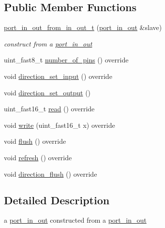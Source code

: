\subsection*{Public Member Functions}
\begin{DoxyCompactItemize}
\item 
\mbox{\label{classhwlib_1_1port__in__out__from__in__out__t_a44a7dec3d4fd5604177a07c6c7fa9838}} 
\hyperlink{classhwlib_1_1port__in__out__from__in__out__t_a44a7dec3d4fd5604177a07c6c7fa9838}{port\+\_\+in\+\_\+out\+\_\+from\+\_\+in\+\_\+out\+\_\+t} (\hyperlink{classhwlib_1_1port__in__out}{port\+\_\+in\+\_\+out} \&slave)
\begin{DoxyCompactList}\small\item\em construct from a \hyperlink{classhwlib_1_1port__in__out}{port\+\_\+in\+\_\+out} \end{DoxyCompactList}\item 
uint\+\_\+fast8\+\_\+t \hyperlink{classhwlib_1_1port__in__out__from__in__out__t_a07646684024952afc6c166142f0d181b}{number\+\_\+of\+\_\+pins} () override
\item 
void \hyperlink{classhwlib_1_1port__in__out__from__in__out__t_a49e31b927bbf0c677cc9e436459aae44}{direction\+\_\+set\+\_\+input} () override
\item 
void \hyperlink{classhwlib_1_1port__in__out__from__in__out__t_aa148c50e132f6657d4c3a292b91896da}{direction\+\_\+set\+\_\+output} ()
\item 
uint\+\_\+fast16\+\_\+t \hyperlink{classhwlib_1_1port__in__out__from__in__out__t_a3ee4e60ccde68e997fa48e041dc0e74c}{read} () override
\item 
void \hyperlink{classhwlib_1_1port__in__out__from__in__out__t_acf0e3831b73a125fed1bbf6e9986551c}{write} (uint\+\_\+fast16\+\_\+t x) override
\item 
void \hyperlink{classhwlib_1_1port__in__out__from__in__out__t_a7ae629f8dc18f39975494b5f370551b2}{flush} () override
\item 
void \hyperlink{classhwlib_1_1port__in__out__from__in__out__t_a35caf2a5266975de6065d2cd801f47f3}{refresh} () override
\item 
void \hyperlink{classhwlib_1_1port__in__out__from__in__out__t_a4bf6d967ceda394a0de3d23fc9895072}{direction\+\_\+flush} () override
\end{DoxyCompactItemize}


\subsection{Detailed Description}
a \hyperlink{classhwlib_1_1port__in__out}{port\+\_\+in\+\_\+out} constructed from a \hyperlink{classhwlib_1_1port__in__out}{port\+\_\+in\+\_\+out}

